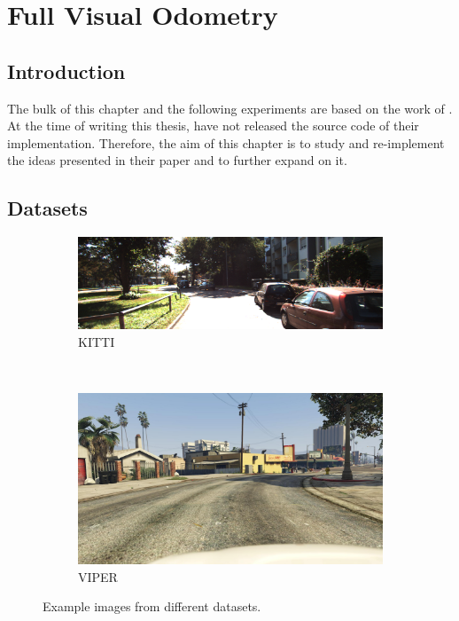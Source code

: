 \chapter{Full Visual Odometry}

	\section{Introduction}
	The bulk of this chapter and the following experiments are based on the work of \cite{wang2017deepvo}.
	At the time of writing this thesis, \citeauthor{wang2017deepvo} have not released the source code of their implementation.
	Therefore, the aim of this chapter is to study and re-implement the ideas presented in their paper and to further expand on it.
	
	\section{Datasets}
		\begin{figure}
			\centering
			\begin{subfigure}[b]{0.8\linewidth}
				\centering
				\includegraphics[width=\linewidth]{Images/Data/kitti-example-image}
				\caption{
					KITTI
					\label{fig:kitti-example-image}
				}
			\end{subfigure}%
			\\
			\begin{subfigure}[b]{0.8\linewidth}
				\centering
				\includegraphics[width=\linewidth]{Images/Data/viper-example-image}
				\caption{
					VIPER
					\label{fig:viper-example-image}
				}
			\end{subfigure}%
			\caption[Example images from different datasets]
					{Example images from different datasets.
					 \label{fig:example-images-from-datasets}}
		\end{figure}
